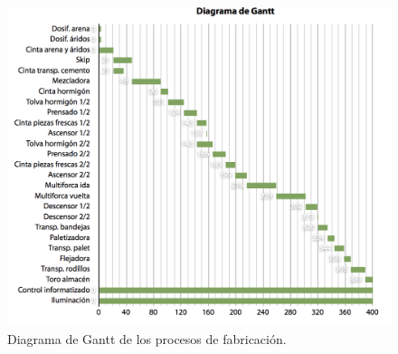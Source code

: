 \begin{figure}[!htb]
\centering
\includegraphics[width=15cm]{gantt.png}
\caption{Diagrama de Gantt de los procesos de fabricación.}
\label{fig:gant}
\end{figure}

